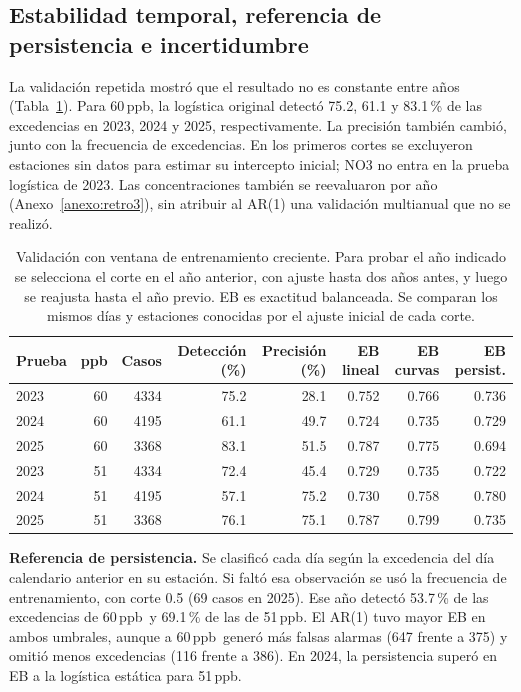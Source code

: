 \documentclass[11pt,letterpaper]{article}
\newcommand{\ppb}{\,ppb}
\newenvironment{cambio}{}{}
\begin{document}
\begin{cambio}
\subsection{Estabilidad temporal, referencia de persistencia e incertidumbre}
La validación repetida mostró que el resultado no es constante entre años (Tabla~\ref{tab:validacion_repetida}). Para 60\ppb, la logística original detectó 75.2, 61.1 y 83.1\,\% de las excedencias en 2023, 2024 y 2025, respectivamente. La precisión también cambió, junto con la frecuencia de excedencias. En los primeros cortes se excluyeron estaciones sin datos para estimar su intercepto inicial; NO3 no entra en la prueba logística de 2023. Las concentraciones también se reevaluaron por año (Anexo~\ref{anexo:retro3}), sin atribuir al AR(1) una validación multianual que no se realizó.
\end{cambio}
\begin{table}[H]
\begin{cambio}\centering\small
\begin{tabular}{@{}lrrrrrrr@{}}\toprule
Prueba & ppb & Casos & Detección (\%) & Precisión (\%) & EB lineal & EB curvas & EB persist.\\\midrule
2023 & 60 & 4334 & 75.2 & 28.1 & 0.752 & 0.766 & 0.736\\
2024 & 60 & 4195 & 61.1 & 49.7 & 0.724 & 0.735 & 0.729\\
2025 & 60 & 3368 & 83.1 & 51.5 & 0.787 & 0.775 & 0.694\\
2023 & 51 & 4334 & 72.4 & 45.4 & 0.729 & 0.735 & 0.722\\
2024 & 51 & 4195 & 57.1 & 75.2 & 0.730 & 0.758 & 0.780\\
2025 & 51 & 3368 & 76.1 & 75.1 & 0.787 & 0.799 & 0.735\\
\bottomrule\end{tabular}
\caption{Validación con ventana de entrenamiento creciente. Para probar el año indicado se selecciona el corte en el año anterior, con ajuste hasta dos años antes, y luego se reajusta hasta el año previo. EB es exactitud balanceada. Se comparan los mismos días y estaciones conocidas por el ajuste inicial de cada corte.}\label{tab:validacion_repetida}
\end{cambio}
\end{table}
\begin{cambio}
\textbf{Referencia de persistencia.} Se clasificó cada día según la excedencia del día calendario anterior en su estación. Si faltó esa observación se usó la frecuencia de entrenamiento, con corte 0.5 (69 casos en 2025). Ese año detectó 53.7\,\% de las excedencias de 60\ppb\ y 69.1\,\% de las de 51\ppb. El AR(1) tuvo mayor EB en ambos umbrales, aunque a 60\ppb\ generó más falsas alarmas (647 frente a 375) y omitió menos excedencias (116 frente a 386). En 2024, la persistencia superó en EB a la logística estática para 51\ppb.
\end{cambio}
\end{document}
